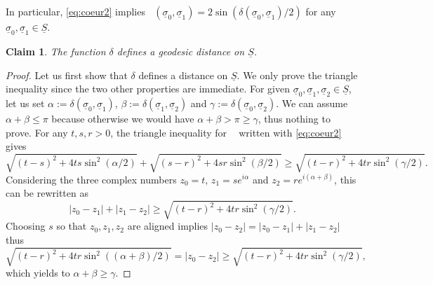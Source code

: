 \documentclass[10pt]{amsart}
\theoremstyle{plain}
\newtheorem{claim}[theorem]{Claim}
\theoremstyle{definition}
\newcommand{\dist}{\mathsf{d}}
\newcommand{\usigma}{\underline{\sigma}}
\DeclareMathOperator{\udist}{\underline{\dist}}
\newcommand{\uS}{\underline{S}}
\begin{document}
In particular, \eqref{eq:coeur2} implies
$\udist(\usigma_0,\usigma_1)=2\sin(\delta(\usigma_0,\usigma_1)/2)$
for any $\usigma_0,\usigma_1 \in \uS$.

\begin{claim}\label{claim:geodesicdelta}
The function $\delta$ defines a geodesic distance on $\uS$.
\end{claim}

\begin{proof}
Let us first show that $\delta$ defines a distance on $\uS$. We only prove the triangle inequality since the two other properties are immediate. For given $\usigma_0, \usigma_1,\usigma_2 \in \uS$, let us set $\alpha:= \delta(\usigma_0,\usigma_1)$, $\beta:=\delta(\usigma_1,\usigma_2)$ and $\gamma:=\delta(\usigma_0,\usigma_2)$. We can assume $\alpha + \beta \le \pi$ because otherwise we would have $\alpha + \beta > \pi \ge \gamma$, thus nothing to prove. For any $t,s,r>0$, the triangle inequality for $\udist$ written with \eqref{eq:coeur2} gives
\[
\sqrt{(t-s)^2 + 4 ts\sin^2(\alpha/2)} + \sqrt{(s-r)^2 + 4 sr\sin^2(\beta/2)} \ge \sqrt{(t-r)^2 + 4tr\sin^2(\gamma/2)}.
\]
Considering the three complex numbers $z_0=t$, $z_1 = se^{i\alpha}$ and $z_2 = re^{i(\alpha + \beta)}$, this can be rewritten as
\[
|z_0-z_1| + |z_1-z_2| \ge \sqrt{(t-r)^2 + 4tr\sin^2(\gamma/2)}.
\]
Choosing $s$ so that $z_0, z_1, z_2$ are aligned implies $|z_0-z_2| = |z_0-z_1| + |z_1 - z_2|$ thus
\[
\sqrt{(t-r)^2 + 4tr\sin^2((\alpha+\beta)/2)} = |z_0-z_2| \ge \sqrt{(t-r)^2+ 4tr\sin^2(\gamma/2)},
\]
which yields to $\alpha + \beta \ge \gamma$.


\end{proof}
\end{document}
